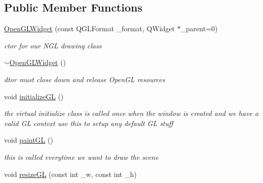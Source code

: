 \subsection*{Public Member Functions}
\begin{DoxyCompactItemize}
\item 
\hyperlink{class_open_g_l_widget_a60b9008fd7762190918d5e2528a57248}{Open\-G\-L\-Widget} (const Q\-G\-L\-Format \-\_\-format, Q\-Widget $\ast$\-\_\-parent=0)
\begin{DoxyCompactList}\small\item\em ctor for our N\-G\-L drawing class \end{DoxyCompactList}\item 
\hypertarget{class_open_g_l_widget_a293847f6a7e6c40344a1acfca3e9eb51}{\hyperlink{class_open_g_l_widget_a293847f6a7e6c40344a1acfca3e9eb51}{$\sim$\-Open\-G\-L\-Widget} ()}\label{class_open_g_l_widget_a293847f6a7e6c40344a1acfca3e9eb51}

\begin{DoxyCompactList}\small\item\em dtor must close down and release Open\-G\-L resources \end{DoxyCompactList}\item 
\hypertarget{class_open_g_l_widget_a570df546f7206455c57addb624906576}{void \hyperlink{class_open_g_l_widget_a570df546f7206455c57addb624906576}{initialize\-G\-L} ()}\label{class_open_g_l_widget_a570df546f7206455c57addb624906576}

\begin{DoxyCompactList}\small\item\em the virtual initialize class is called once when the window is created and we have a valid G\-L context use this to setup any default G\-L stuff \end{DoxyCompactList}\item 
\hypertarget{class_open_g_l_widget_a260a543726f601659cbd1809b90f9e4b}{void \hyperlink{class_open_g_l_widget_a260a543726f601659cbd1809b90f9e4b}{paint\-G\-L} ()}\label{class_open_g_l_widget_a260a543726f601659cbd1809b90f9e4b}

\begin{DoxyCompactList}\small\item\em this is called everytime we want to draw the scene \end{DoxyCompactList}\item 
\hypertarget{class_open_g_l_widget_a55cf4659a7f10207fb6ab3fcf9273abc}{void \hyperlink{class_open_g_l_widget_a55cf4659a7f10207fb6ab3fcf9273abc}{resize\-G\-L} (const int \-\_\-w, const int \-\_\-h)}\label{class_open_g_l_widget_a55cf4659a7f10207fb6ab3fcf9273abc}


\end{DoxyCompactItemize}
